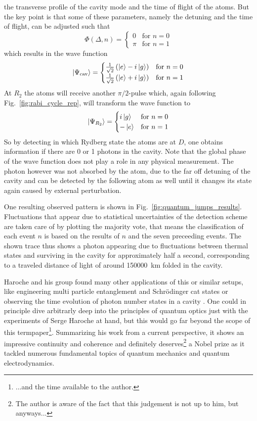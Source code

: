 the transverse profile of the cavity mode and
the time of flight of the atoms. But the key point is that some of these
parameters, namely the detuning and the time of flight, can be adjusted such
that
$$ \Phi(\Delta, n) = 
\begin{cases}
  0 & \text{for } n=0 \\
  \pi & \text{for } n=1
\end{cases}
$$
which results in the wave function 
$$ \ket{\Psi_{\text{cav}}} = 
\begin{cases}
  \frac{1}{\sqrt{2}} \left(\ket{e} - i\ket{g}\right) & \text{for } n=0\\
  \frac{1}{\sqrt{2}} \left(\ket{e} + i\ket{g}\right) & \text{for } n=1\\
\end{cases}
$$
At $R_2$ the atoms will receive another $\pi/2$-pulse which, again following
Fig.~\ref{fig:rabi_cycle_rep}, will transform the
wave function to 
$$ \ket{\Psi_{R_2}} = 
\begin{cases}
   i\ket{g} & \text{for } n=0\\
  -\ket{e}  & \text{for } n=1\\
\end{cases}
$$
So by detecting in which Rydberg state the atoms are at $D$, one obtains
information if there are 0 or 1 photons in the cavity. Note that the global
phase of the wave function does not play a role in any physical measurement. The
photon however was not absorbed by the atom, due to the far off detuning of the
cavity and can be detected by the following atom as well until it changes its
state again caused by external perturbation.

One resulting observed pattern is shown in Fig.~\ref{fig:quantum_jumps_results}.
Fluctuations that appear due to statistical uncertainties of the detection
scheme are taken care of by plotting the majority vote, that means the
classification of each event $n$ is based on the results of $n$ and the seven
preceeding events. The shown trace thus shows a photon appearing due to
fluctuations between thermal states and surviving in the cavity for
approximately half a second, corresponding to a traveled distance of light of around
\SI{150000}{\kilo\meter} folded in the cavity.

Haroche and his group found many other applications of this or similar setups,
like engineering multi particle entanglement \cite{rauschenbeutel2000step} and
Schrödinger cat states \cite{brune1992manipulation} or observing
the time evolution of photon number states in a cavity
\cite{guerlin2007progressive}. One could in principle
dive arbitrarly deep into the principles of quantum optics just with the
experiments of Serge Haroche at hand, but this would go far beyond the scope of
this termpaper\footnote{...and the time available to the author.}. Summarizing his work from a current perspective, it shows an
impressive continuity and coherence and definitely deserves\footnote{The author
is aware of the fact that this judgement is not up to him, but anyways...} a Nobel prize as it
tackled numerous fundamental topics of quantum mechanics and quantum
electrodynamics.
